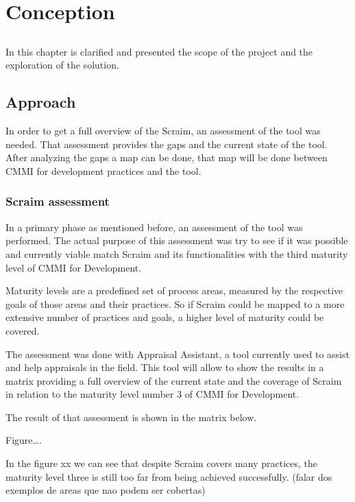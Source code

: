 \chapter{Conception} \label{chap:conception}

\section*{}

In this chapter is clarified and presented the scope of the project and the exploration of the solution.

\section{Approach} \label{sec:Approach}
In order to get a full overview of the Scraim, an assessment of the tool was needed. That assessment provides the gaps and the current state of the tool.
After analyzing the gaps a map can be done, that map will be done between CMMI for development practices and the tool.

\subsection{Scraim assessment}
In a primary phase as mentioned before, an assessment of the tool was performed. The actual purpose of this assessment was try to see if it was possible and currently viable match Scraim and its functionalities with the third maturity level of CMMI for Development. 

Maturity levels are a predefined set of process areas, measured by the respective goals of those areas and their practices. So if Scraim could be mapped to a more extensive number of practices and goals, a higher level of maturity could be covered.

The assessment was done with Appraisal Assistant, a tool currently used to assist and help appraisals in the field. This tool will allow to show the results in a matrix providing a full overview of the current state and the coverage of Scraim in relation to the maturity level number 3 of CMMI for Development.

The result of that assessment is shown in the matrix below.

Figure….
	
In the figure xx we can see that despite Scraim covers many practices, the maturity level three is still too far from being achieved successfully.
(falar dos exemplos de areas que nao podem ser cobertas)

